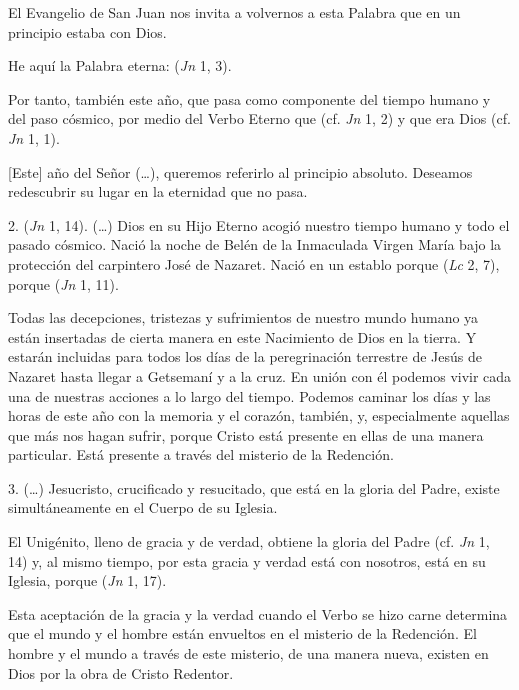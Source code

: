 \begin{body}
	El Evangelio de San Juan nos invita a volvernos a esta Palabra que en un principio estaba con Dios.

	He aquí la Palabra eterna:  (\emph{Jn} 1, 3).

	Por tanto, también este año, que pasa como componente del tiempo humano y del paso cósmico,  por medio del Verbo Eterno que  (cf. \emph{Jn} 1, 2) y que era Dios (cf. \emph{Jn} 1, 1).

	{[}Este{]} año del Señor (\ldots{}), queremos referirlo al principio absoluto. Deseamos redescubrir su lugar en la eternidad que no pasa.

	2.  (\emph{Jn} 1, 14). (\ldots{}) Dios en su Hijo Eterno acogió nuestro tiempo humano y todo el pasado cósmico. Nació la noche de Belén de la Inmaculada Virgen María bajo la protección del carpintero José de Nazaret. Nació en un establo porque  (\emph{Lc} 2, 7), porque  (\emph{Jn} 1, 11).

	Todas las decepciones, tristezas y sufrimientos de nuestro mundo humano ya están insertadas de cierta manera en este Nacimiento de Dios en la tierra. Y estarán incluidas para todos los días de la peregrinación terrestre de Jesús de Nazaret hasta llegar a Getsemaní y a la cruz. En unión con él podemos vivir cada una de nuestras acciones a lo largo del tiempo. Podemos caminar los días y las horas de este año con la memoria y el corazón, también, y, especialmente aquellas que más nos hagan sufrir, porque Cristo está presente en ellas de una manera particular. Está presente a través del misterio de la Redención.

	3. (\ldots{}) Jesucristo, crucificado y resucitado, que está en la gloria del Padre, existe simultáneamente en el Cuerpo de su Iglesia.

	El Unigénito, lleno de gracia y de verdad, obtiene la gloria del Padre (cf. \emph{Jn} 1, 14) y, al mismo tiempo, por esta gracia y verdad está con nosotros, está en su Iglesia, porque  (\emph{Jn} 1, 17).

	Esta aceptación de la gracia y la verdad cuando el Verbo se hizo carne determina que el mundo y el hombre están envueltos en el misterio de la Redención. El hombre y el mundo a través de este misterio, de una manera nueva, existen en Dios por la obra de Cristo Redentor.


\end{body}
